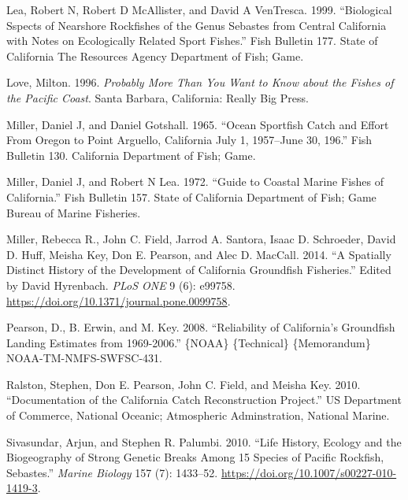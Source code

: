 \documentclass[11pt,
  english,
  letterpaper,
]{article}
\newlength{\cslhangindent}
\newenvironment{CSLReferences}[2] %
 {%
  \setlength{\parindent}{0pt}
  \ifodd #1 \everypar{\setlength{\hangindent}{\cslhangindent}}\ignorespaces\fi
  \ifnum #2 > 0
  \setlength{\parskip}{#2\baselineskip}
  \fi
 }%
 {}
\begin{document}
\begin{CSLReferences}{1}{0}
\leavevmode{}%
Lea, Robert N, Robert D McAllister, and David A VenTresca. 1999. {``Biological Sspects of Nearshore Rockfishes of the Genus Sebastes from {Central} {California} with Notes on Ecologically Related Sport Fishes.''} Fish Bulletin 177. State of California The Resources Agency Department of Fish; Game.

\leavevmode{}%
Love, Milton. 1996. \emph{Probably More Than You Want to Know about the Fishes of the {Pacific} {Coast}}. Santa Barbara, California: Really Big Press.

\leavevmode{}%
Miller, Daniel J, and Daniel Gotshall. 1965. {``Ocean {Sportfish} {Catch} and {Effort} {From} {Oregon} to {Point} {Arguello}, {California} {July} 1, 1957--{June} 30, 196.''} Fish Bulletin 130. California Department of Fish; Game.

\leavevmode{}%
Miller, Daniel J, and Robert N Lea. 1972. {``Guide to Coastal {Marine} {Fishes} of {California}.''} Fish Bulletin 157. State of California Department of Fish; Game Bureau of Marine Fisheries.

\leavevmode{}%
Miller, Rebecca R., John C. Field, Jarrod A. Santora, Isaac D. Schroeder, David D. Huff, Meisha Key, Don E. Pearson, and Alec D. MacCall. 2014. {``A {Spatially} {Distinct} {History} of the {Development} of {California} {Groundfish} {Fisheries}.''} Edited by David Hyrenbach. \emph{PLoS ONE} 9 (6): e99758. \url{https://doi.org/10.1371/journal.pone.0099758}.

\leavevmode{}%
Pearson, D., B. Erwin, and M. Key. 2008. {``Reliability of {California}'s {Groundfish} {Landing} {Estimates} from 1969-2006.''} \{NOAA\} \{Technical\} \{Memorandum\} NOAA-TM-NMFS-SWFSC-431.

\leavevmode{}%
Ralston, Stephen, Don E. Pearson, John C. Field, and Meisha Key. 2010. {``Documentation of the {California} Catch Reconstruction Project.''} US Department of Commerce, National Oceanic; Atmospheric Adminstration, National Marine.

\leavevmode{}%
Sivasundar, Arjun, and Stephen R. Palumbi. 2010. {``Life History, Ecology and the Biogeography of Strong Genetic Breaks Among 15 Species of {Pacific} Rockfish, {Sebastes}.''} \emph{Marine Biology} 157 (7): 1433--52. \url{https://doi.org/10.1007/s00227-010-1419-3}.


\end{CSLReferences}
\end{document}
